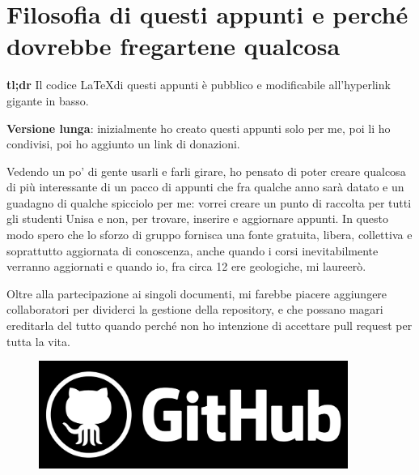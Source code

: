     \vspace{3mm}
    \section{Filosofia di questi appunti e perché dovrebbe fregartene qualcosa}
        \textbf{tl;dr} Il codice \LaTeX di questi appunti è pubblico e modificabile all'hyperlink gigante in basso.
        
        \textbf{Versione lunga}: inizialmente ho creato questi appunti solo per me, poi li ho condivisi, poi ho aggiunto un link di donazioni.
        
        Vedendo un po' di gente usarli e farli girare, ho pensato di poter creare qualcosa di più interessante di un pacco di appunti che fra qualche anno sarà datato e un guadagno di qualche spicciolo per me: vorrei creare un punto di raccolta per tutti gli studenti Unisa e non, per trovare, inserire e aggiornare appunti. In questo modo spero che lo sforzo di gruppo fornisca una fonte gratuita, libera, collettiva e soprattutto aggiornata di conoscenza, anche quando i corsi inevitabilmente verranno aggiornati e quando io, fra circa 12 ere geologiche, mi laureerò.
        
        \vspace{3mm}
        
        Oltre alla partecipazione ai singoli documenti, mi farebbe piacere aggiungere collaboratori per dividerci la gestione della repository, e che possano magari ereditarla del tutto quando perché non ho intenzione di accettare pull request per tutta la vita.
    \begin{figure}[h]
        \centering
        \href{https://github.com/shyimon/UnisaComeBabele}
        {\includegraphics[width=0.9\textwidth]{img/github.png}}
    \end{figure}